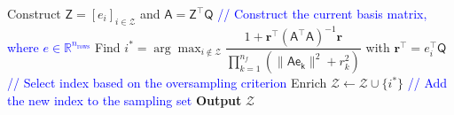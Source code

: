 \documentclass[11pt]{article}
\begin{document}
\begin{algorithm}[H]
\begin{algorithmic}[1]
    \STATE Construct $\mathsf{Z} = [\mathit{e}_i]_{i \in \mathcal{Z}}$ and $\mathsf{A} = \mathsf{Z}^\top \mathsf{Q}$ \textcolor{blue}{// Construct the current basis matrix, where $\mathit{e} \in \mathbb{R}^{n_{\text{rows}}}$}
    \STATE Find $i^* = \arg\max_{i \notin \mathcal{Z}} \dfrac{1 + \mathbf{r}^\top (\mathsf{A}^\top \mathsf{A})^{-1} \mathbf{r}}{\prod_{k=1}^{n_f} (\|\mathsf{Ae_k}\|^2 + r_k^2)}$ with $\mathbf{r}^\top = \mathit{e}_i^\top \mathsf{Q}$ \textcolor{blue}{// Select index based on the oversampling criterion}
    \STATE Enrich $\mathcal{Z} \leftarrow \mathcal{Z} \cup \{i^*\}$ \textcolor{blue}{// Add the new index to the sampling set}
\ENDFOR
\STATE \textbf{Output} $\mathcal{Z}$
\end{algorithmic}
\label{alg:S_OPT}
\end{algorithm}
\end{document}
